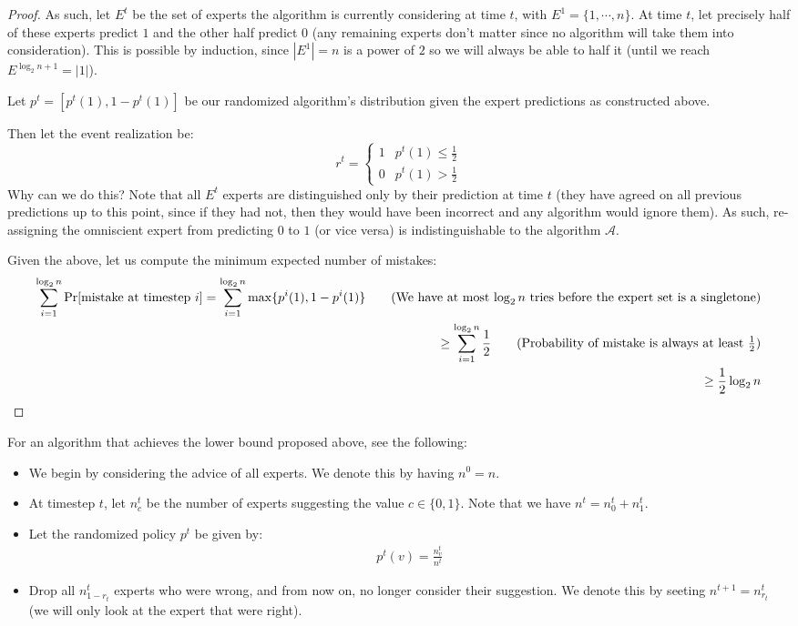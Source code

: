 \documentclass[12pt]{exam}
\begin{document}
\begin{questions}
\begin{solution}
\begin{enumerate}[label=(\alph*)]
\begin{proof}
        As such, let $E^t$ be the set of experts the algorithm is currently considering at time $t$, with $E^1 = \{1, \cdots, n\}$. At time $t$, let precisely half of these experts predict $1$ and the other half predict $0$ (any remaining experts don't matter since no algorithm will take them into consideration). This is possible by induction, since $|E^1| = n$ is a power of $2$ so we will always be able to half it (until we reach $E^{\log_2 n + 1} = |1|$).

        Let $p^t = [p^t(1), 1 - p^t(1)]$ be our randomized algorithm's distribution given the expert predictions as constructed above.

        Then let the event realization be:
        \[
          r^t = \begin{cases}
            1 & p^t(1) \leq \frac{1}{2}  \\
            0 & p^t(1) > \frac{1}{2}
          \end{cases}
        \]
        Why can we do this? Note that all $E^t$ experts are distinguished only by their prediction at time $t$ (they have agreed on all previous predictions up to this point, since if they had not, then they would have been incorrect and any algorithm would ignore them). As such, re-assigning the omniscient expert from predicting $0$ to $1$ (or vice versa) is indistinguishable to the algorithm $\mathcal{A}$.

        Given the above, let us compute the minimum expected number of mistakes:
        \begin{align*}
          \sum_{i=1}^{\log_2 n} \Pr[\text{mistake at timestep $i$}]  = \sum_{i=1}^{\log_2 n} \max\{p^i(1), 1 - p^i(1)\} \tag{We have at most $\log_2 n$ tries before the expert set is a singletone} \\
          \geq \sum_{i=1}^{\log_2 n} \frac{1}{2} \tag{Probability of mistake is always at least $\frac{1}{2}$} \\
          \geq \frac{1}{2} \log_2 n
        \end{align*}
      \end{proof}
      For an algorithm that achieves the lower bound proposed above, see the following:
      \begin{itemize}
        \item We begin by considering the advice of all experts. We denote this by having $n^0 = n$.
        \item At timestep $t$, let $n^t_c$ be the number of experts suggesting the value $c \in \{0,1\}$. Note that we have $n^t = n^t_0 + n^t_1$.
        \item Let the randomized policy $p^t$ be given by:
          \begin{align*}
            p^t(v) = \frac{n^t_v}{n^t} 
          \end{align*}
        \item Drop all $n^t_{1-r_t}$ experts who were wrong, and from now on, no longer consider their suggestion. We denote this by seeting $n^{t+1} = n^t_{r_t}$ (we will only look at the expert that were right).
      \end{itemize}


\end{enumerate}
\end{solution}
\end{questions}
\end{document}
